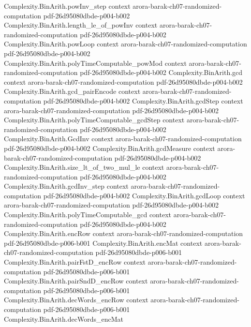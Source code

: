 \begin{theorem}
\proofstep
  {Complexity.BinArith.powInv_step}
  {context}
  {arora-barak-ch07-randomized-computation}
  {pdf-26d95080dbde-p004-b002}
\proofstep
  {Complexity.BinArith.length_le_of_powInv}
  {context}
  {arora-barak-ch07-randomized-computation}
  {pdf-26d95080dbde-p004-b002}
\proofstep
  {Complexity.BinArith.powLoop}
  {context}
  {arora-barak-ch07-randomized-computation}
  {pdf-26d95080dbde-p004-b002}
\proofstep
  {Complexity.BinArith.polyTimeComputable_powMod}
  {context}
  {arora-barak-ch07-randomized-computation}
  {pdf-26d95080dbde-p004-b002}
\proofstep
  {Complexity.BinArith.gcd}
  {context}
  {arora-barak-ch07-randomized-computation}
  {pdf-26d95080dbde-p004-b002}
\proofstep
  {Complexity.BinArith.gcd_pairEncode}
  {context}
  {arora-barak-ch07-randomized-computation}
  {pdf-26d95080dbde-p004-b002}
\proofstep
  {Complexity.BinArith.gcdStep}
  {context}
  {arora-barak-ch07-randomized-computation}
  {pdf-26d95080dbde-p004-b002}
\proofstep
  {Complexity.BinArith.polyTimeComputable_gcdStep}
  {context}
  {arora-barak-ch07-randomized-computation}
  {pdf-26d95080dbde-p004-b002}
\proofstep
  {Complexity.BinArith.GcdInv}
  {context}
  {arora-barak-ch07-randomized-computation}
  {pdf-26d95080dbde-p004-b002}
\proofstep
  {Complexity.BinArith.gcdMeasure}
  {context}
  {arora-barak-ch07-randomized-computation}
  {pdf-26d95080dbde-p004-b002}
\proofstep
  {Complexity.BinArith.size_lt_of_two_mul_le}
  {context}
  {arora-barak-ch07-randomized-computation}
  {pdf-26d95080dbde-p004-b002}
\proofstep
  {Complexity.BinArith.gcdInv_step}
  {context}
  {arora-barak-ch07-randomized-computation}
  {pdf-26d95080dbde-p004-b002}
\proofstep
  {Complexity.BinArith.gcdLoop}
  {context}
  {arora-barak-ch07-randomized-computation}
  {pdf-26d95080dbde-p004-b002}
\proofstep
  {Complexity.BinArith.polyTimeComputable_gcd}
  {context}
  {arora-barak-ch07-randomized-computation}
  {pdf-26d95080dbde-p004-b002}
\proofstep
  {Complexity.BinArith.encRow}
  {context}
  {arora-barak-ch07-randomized-computation}
  {pdf-26d95080dbde-p006-b001}
\proofstep
  {Complexity.BinArith.encMat}
  {context}
  {arora-barak-ch07-randomized-computation}
  {pdf-26d95080dbde-p006-b001}
\proofstep
  {Complexity.BinArith.pairFstD_encRow}
  {context}
  {arora-barak-ch07-randomized-computation}
  {pdf-26d95080dbde-p006-b001}
\proofstep
  {Complexity.BinArith.pairSndD_encRow}
  {context}
  {arora-barak-ch07-randomized-computation}
  {pdf-26d95080dbde-p006-b001}
\proofstep
  {Complexity.BinArith.decWords_encRow}
  {context}
  {arora-barak-ch07-randomized-computation}
  {pdf-26d95080dbde-p006-b001}
\proofstep
  {Complexity.BinArith.decWords_encMat}

\end{theorem}
